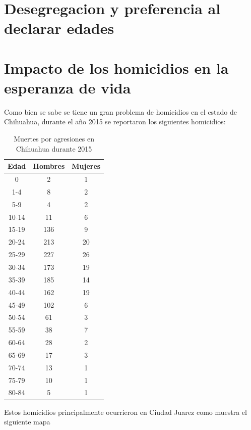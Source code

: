\documentclass[fontsize=11pt]{article}
\begin{document}
\section*{Desegregacion y preferencia al declarar edades}
\section*{Impacto de los homicidios en la esperanza de vida}
Como bien se sabe se tiene un gran problema de homicidios en el estado de Chihuahua, durante el año 2015 se reportaron\cite{DAT} los siguientes homicidios: 


\begin{table}[h!]
\centering

\begin{tabular}{|c|c|c|}
\hline
Edad  & Hombres & Mujeres \\ \hline
0     & 2       & 1       \\ \hline
1-4   & 8       & 2       \\ \hline
5-9   & 4       & 2       \\ \hline
10-14 & 11      & 6       \\ \hline
15-19 & 136     & 9       \\ \hline
20-24 & 213     & 20      \\ \hline
25-29 & 227     & 26      \\ \hline
30-34 & 173     & 19      \\ \hline
35-39 & 185     & 14      \\ \hline
40-44 & 162     & 19      \\ \hline
45-49 & 102     & 6       \\ \hline
50-54 & 61      & 3       \\ \hline
55-59 & 38      & 7       \\ \hline
60-64 & 28      & 2       \\ \hline
65-69 & 17      & 3       \\ \hline
70-74 & 13      & 1       \\ \hline
75-79 & 10      & 1       \\ \hline
80-84 & 5       & 1       \\ \hline
\end{tabular}
\caption{Muertes por agresiones en Chihuahua durante 2015}
\end{table}
\label{my-label}
Estos homicidios principalmente ocurrieron en Ciudad Juarez como muestra el siguiente mapa 
\end{document}
